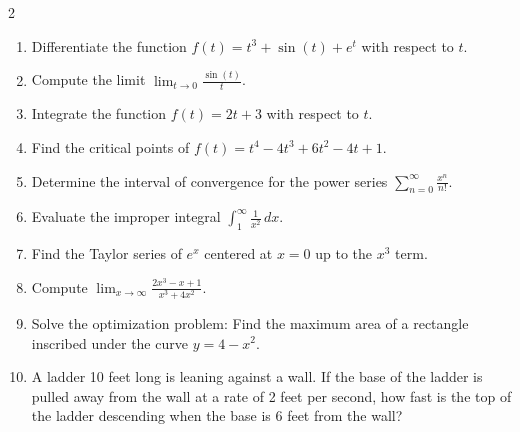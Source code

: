 \newpage

\practice{}

\begin{multicols}{2}

\begin{enumerate}
    \item Differentiate the function \( f(t) = t^3 + \sin(t) + e^t \) with respect to \( t \).
    \item Compute the limit \( \lim_{t \to 0} \frac{\sin(t)}{t} \).
    \item Integrate the function \( f(t) = 2t + 3 \) with respect to \( t \).
    \item Find the critical points of \( f(t) = t^4 - 4t^3 + 6t^2 - 4t + 1 \).
    \item Determine the interval of convergence for the power series \( \sum_{n=0}^{\infty} \frac{x^n}{n!} \).
    \item Evaluate the improper integral \( \int_{1}^{\infty} \frac{1}{x^2} \, dx \).
    \item Find the Taylor series of \( e^x \) centered at \( x = 0 \) up to the \( x^3 \) term.
    \item Compute \( \lim_{x \to \infty} \frac{2x^3 - x + 1}{x^3 + 4x^2} \).
    \item Solve the optimization problem: Find the maximum area of a rectangle inscribed under the curve \( y = 4 - x^2 \).
    \item A ladder 10 feet long is leaning against a wall. If the base of the ladder is pulled away from the wall at a rate of 2 feet per second, how fast is the top of the ladder descending when the base is 6 feet from the wall?


\end{enumerate}
\end{multicols}
